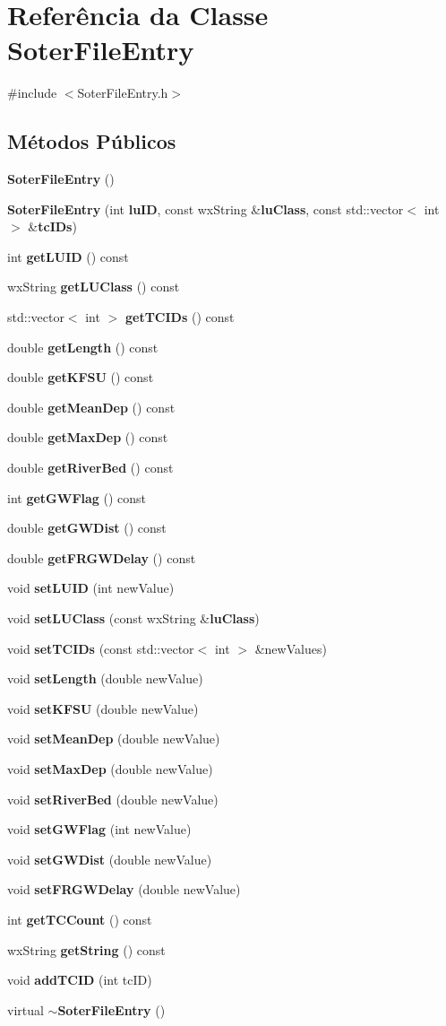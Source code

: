 \section{Referência da Classe Soter\+File\+Entry}
\label{class_soter_file_entry}


{\ttfamily \#include $<$Soter\+File\+Entry.\+h$>$}

\subsection*{Métodos Públicos}
\begin{DoxyCompactItemize}
\item 
{\bf Soter\+File\+Entry} ()
\item 
{\bf Soter\+File\+Entry} (int {\bf lu\+ID}, const wx\+String \&{\bf lu\+Class}, const std\+::vector$<$ int $>$ \&{\bf tc\+I\+Ds})
\item 
int {\bf get\+L\+U\+ID} () const 
\item 
wx\+String {\bf get\+L\+U\+Class} () const 
\item 
std\+::vector$<$ int $>$ {\bf get\+T\+C\+I\+Ds} () const 
\item 
double {\bf get\+Length} () const 
\item 
double {\bf get\+K\+F\+SU} () const 
\item 
double {\bf get\+Mean\+Dep} () const 
\item 
double {\bf get\+Max\+Dep} () const 
\item 
double {\bf get\+River\+Bed} () const 
\item 
int {\bf get\+G\+W\+Flag} () const 
\item 
double {\bf get\+G\+W\+Dist} () const 
\item 
double {\bf get\+F\+R\+G\+W\+Delay} () const 
\item 
void {\bf set\+L\+U\+ID} (int new\+Value)
\item 
void {\bf set\+L\+U\+Class} (const wx\+String \&{\bf lu\+Class})
\item 
void {\bf set\+T\+C\+I\+Ds} (const std\+::vector$<$ int $>$ \&new\+Values)
\item 
void {\bf set\+Length} (double new\+Value)
\item 
void {\bf set\+K\+F\+SU} (double new\+Value)
\item 
void {\bf set\+Mean\+Dep} (double new\+Value)
\item 
void {\bf set\+Max\+Dep} (double new\+Value)
\item 
void {\bf set\+River\+Bed} (double new\+Value)
\item 
void {\bf set\+G\+W\+Flag} (int new\+Value)
\item 
void {\bf set\+G\+W\+Dist} (double new\+Value)
\item 
void {\bf set\+F\+R\+G\+W\+Delay} (double new\+Value)
\item 
int {\bf get\+T\+C\+Count} () const 
\item 
wx\+String {\bf get\+String} () const 
\item 
void {\bf add\+T\+C\+ID} (int tc\+ID)
\item 
virtual {\bf $\sim$\+Soter\+File\+Entry} ()
\end{DoxyCompactItemize}
